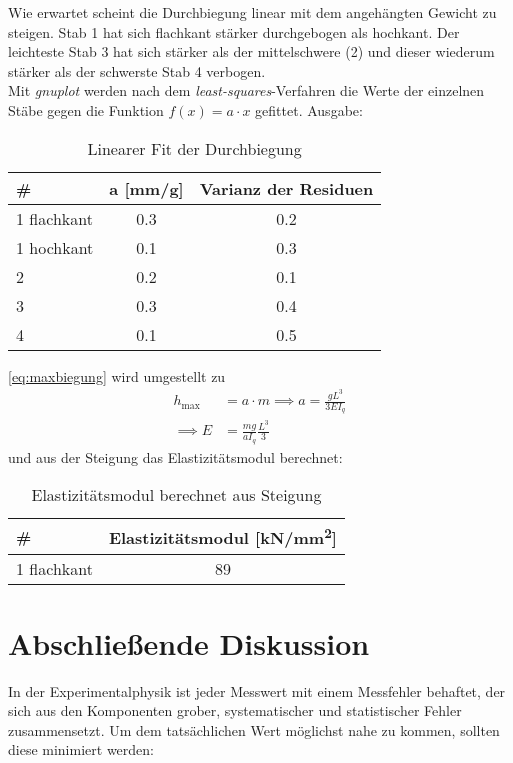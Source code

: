 Wie erwartet scheint die Durchbiegung linear mit dem angehängten Gewicht zu steigen. Stab 1 hat sich flachkant stärker durchgebogen als hochkant. Der leichteste Stab 3 hat sich stärker als der mittelschwere (2) und dieser wiederum stärker als der schwerste Stab 4 verbogen. \\

Mit \emph{gnuplot} werden nach dem \emph{least-squares}-Verfahren die Werte der einzelnen Stäbe gegen die Funktion $f(x)=a\cdot x$ gefittet. Ausgabe:
\begin{table}[H]
  \centering
  \begin{tabular}{l | c | c}
    \# & a [\si{mm/g}] & Varianz der Residuen \\ \hline
    1 flachkant & \num{0.3} & \num{0.2} \\
    1 hochkant & \num{0.1} & \num{0.3} \\
    2 & \num{0.2} & \num{0.1} \\
    3 & \num{0.3} & \num{.4} \\
    4 & \num{.1} & \num{.5}
  \end{tabular}
  \caption{Linearer Fit der Durchbiegung}
  \label{tab:durchbiegungsfit}
\end{table}
\cref{eq:maxbiegung} wird umgestellt zu 
\begin{align}
  h_{\text{max}}&=a\cdot m \implies a = \frac{gL^3}{3EI_q} \\
  \implies E&=\frac{mg}{aI_q}\frac{L^3}{3}
  \label{eq:durchbieg_elasti}
\end{align}
und aus der Steigung das Elastizitätsmodul berechnet:
\begin{table}[H]
  \centering
  \begin{tabular}{l | c}
    \# & Elastizitätsmodul [\si{kN/mm^2}] \\ \hline
    1 flachkant & \num{89}
  \end{tabular}
  \caption{Elastizitätsmodul berechnet aus Steigung}
  \label{tab:elastimodul}
\end{table}
\section{Abschließende Diskussion}

In der Experimentalphysik ist jeder Messwert mit einem Messfehler behaftet, der sich aus den Komponenten grober, systematischer und statistischer Fehler zusammensetzt. Um dem tatsächlichen Wert möglichst nahe zu kommen, sollten diese minimiert werden:

